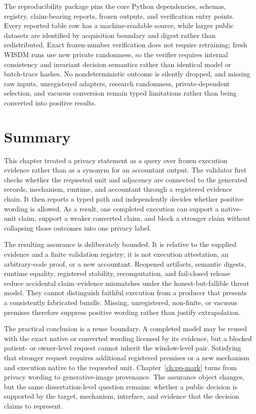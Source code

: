 The reproducibility package pins the core Python dependencies, schemas, registry,
claim-bearing reports, frozen outputs, and verification entry points.  Every
reported table row has a machine-readable source, while larger public datasets are
identified by acquisition boundary and digest rather than redistributed.  Exact
frozen-number verification does not require retraining; fresh WISDM runs use new
private randomness, so the verifier requires internal consistency and invariant
decision semantics rather than identical model or batch-trace hashes.  No
nondeterministic outcome is silently dropped, and missing raw inputs, unregistered
adapters, research randomness, private-dependent selection, and vacuous conversion
remain typed limitations rather than being converted into positive results.

\section{Summary}
\label{sec:ch2-summary-transition}

This chapter treated a privacy statement as a query over frozen execution
evidence rather than as a synonym for an accountant output.  The validator first
checks whether the requested unit and adjacency are connected to the generated
records, mechanism, runtime, and accountant through a registered evidence chain.
It then reports a typed path and independently decides whether positive wording is
allowed.  As a result, one completed execution can support a native-unit claim,
support a weaker converted claim, and block a stronger claim without collapsing
those outcomes into one privacy label.

The resulting assurance is deliberately bounded.  It is relative to the supplied
evidence and a finite validation registry; it is not execution attestation, an
arbitrary-code proof, or a new accountant.  Reopened artifacts, semantic digests,
runtime equality, registered stability, recomputation, and fail-closed release
reduce accidental claim--evidence mismatches under the honest-but-fallible threat
model.  They cannot distinguish faithful execution from a producer that presents
a consistently fabricated bundle.  Missing, unregistered, non-finite, or vacuous
premises therefore suppress positive wording rather than justify extrapolation.

The practical conclusion is a reuse boundary.  A completed model may be reused
with the exact native or converted wording licensed by its evidence, but a blocked
patient- or owner-level request cannot inherit the window-level pair.  Satisfying
that stronger request requires additional registered premises or a new mechanism
and execution native to the requested unit.  Chapter~\ref{ch:pp-mark} turns from
privacy wording to generative-image provenance.  The assurance object changes,
but the same dissertation-level question remains: whether a public decision is
supported by the target, mechanism, interface, and evidence that the decision
claims to represent.
